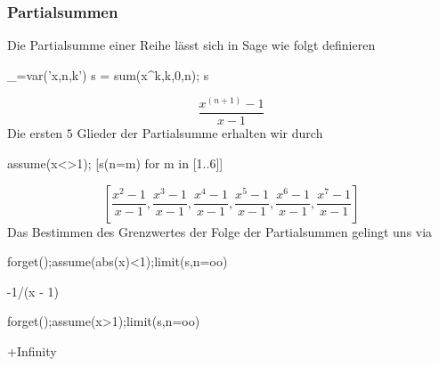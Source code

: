 \documentclass[fontsize=12pt,paper=a4,twoside,bibtotoc,idxtotoc,
liststotoc,pagesize,BCOR1.2cm,DIV15,chapterprefix,pagesize=pdftex]{scrbook}
\theoremstyle{plain}
\theoremstyle{definition}
\theoremstyle{remark}
\begin{document}
\subsubsection{Partialsummen}
Die Partialsumme einer Reihe lässt sich in Sage wie folgt definieren
\begin{sagein}
_=var('x,n,k')
s = sum(x^k,k,0,n); s
\end{sagein}
{\color{blue}\[\frac{x^{{\left(n + 1\right)}} - 1}{x - 1}\]}
Die ersten $5$ Glieder der Partialsumme erhalten wir durch
\begin{sagein}
assume(x<>1); [s(n=m) for m in [1..6]]
\end{sagein}
{\color{blue}\[\left[\frac{x^{2} - 1}{x - 1}, \frac{x^{3} - 1}{x - 1}, \frac{x^{4} - 1}{x - 1}, \frac{x^{5} - 1}{x - 1}, \frac{x^{6} - 1}{x - 1}, \frac{x^{7} - 1}{x - 1}\right] \]}
Das Bestimmen des Grenzwertes der Folge der Partialsummen gelingt uns via
\begin{sagein}
forget();assume(abs(x)<1);limit(s,n=oo)
\end{sagein}
\begin{sage}
-1/(x - 1)
\end{sage}
\begin{sagein}
forget();assume(x>1);limit(s,n=oo)
\end{sagein}
\begin{sage}
+Infinity
\end{sage}
\end{document}
